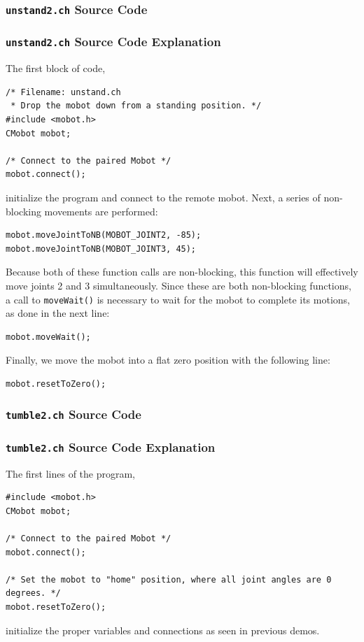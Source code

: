 \documentclass{article}
\begin{document}
\subsubsection{\texttt{unstand2.ch} Source Code}

\subsubsection{\texttt{unstand2.ch} Source Code Explanation}
The first block of code,
\begin{verbatim}
/* Filename: unstand.ch 
 * Drop the mobot down from a standing position. */
#include <mobot.h>
CMobot mobot;

/* Connect to the paired Mobot */
mobot.connect();
\end{verbatim}
initialize the program and connect to the remote mobot. Next, a series of
non-blocking movements are performed:
\begin{verbatim}
mobot.moveJointToNB(MOBOT_JOINT2, -85);
mobot.moveJointToNB(MOBOT_JOINT3, 45);
\end{verbatim}
Because both of these function calls are non-blocking, this function will
effectively move joints 2 and 3 simultaneously. Since these are both
non-blocking functions, a call to \texttt{moveWait()} is necessary to
wait for the mobot to complete its motions, as done in the next line:
\begin{verbatim}
mobot.moveWait();
\end{verbatim}

Finally, we move the mobot into a flat zero position with the following line:
\begin{verbatim}
mobot.resetToZero();
\end{verbatim}

\subsubsection{\texttt{tumble2.ch} Source Code}

\subsubsection{\texttt{tumble2.ch} Source Code Explanation}
The first lines of the program,
\begin{verbatim}
#include <mobot.h>
CMobot mobot;

/* Connect to the paired Mobot */
mobot.connect();

/* Set the mobot to "home" position, where all joint angles are 0 degrees. */
mobot.resetToZero();
\end{verbatim}
initialize the proper variables and connections as seen in previous demos.
\end{document}
